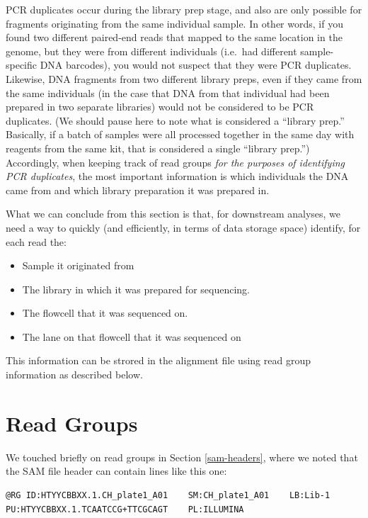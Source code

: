 \documentclass[]{krantz}
\providecommand{\tightlist}{%
  \setlength{\itemsep}{0pt}\setlength{\parskip}{0pt}}
\begin{document}
PCR duplicates occur during the library prep stage, and also are only possible for
fragments originating from the same individual sample. In other words, if you found
two different paired-end reads that mapped to the same location in the genome, but they
were from different individuals (i.e.~had different sample-specific DNA barcodes),
you would not suspect that they were PCR duplicates.
Likewise, DNA fragments from two different library preps, even if they came from the
same individuals (in the case that DNA from that individual had been prepared
in two separate libraries) would not be considered to be PCR duplicates.
(We should pause here to note what is considered a ``library prep.'' Basically,
if a batch of samples were all processed together in the same day with reagents
from the same kit, that is considered a single ``library prep.'')
Accordingly, when keeping track of read groups \emph{for the purposes of identifying PCR duplicates},
the most important information is which individuals the DNA came from
and which library preparation it was prepared in.

What we can conclude from this section is that, for downstream analyses,
we need a way to quickly (and efficiently, in terms of data storage space)
identify, for each read the:

\begin{itemize}
\tightlist
\item
  Sample it originated from
\item
  The library in which it was prepared for sequencing.
\item
  The flowcell that it was sequenced on.
\item
  The lane on that flowcell that it was sequenced on
\end{itemize}

This information can be strored in the alignment file using
read group information as described below.

\hypertarget{read-groups}{%
\section{Read Groups}\label{read-groups}}

We touched briefly on read groups in Section \ref{sam-headers}, where we
noted that the SAM file header can contain lines like this one:

\begin{verbatim}
@RG ID:HTYYCBBXX.1.CH_plate1_A01    SM:CH_plate1_A01    LB:Lib-1    PU:HTYYCBBXX.1.TCAATCCG+TTCGCAGT    PL:ILLUMINA
\end{verbatim}
\end{document}
